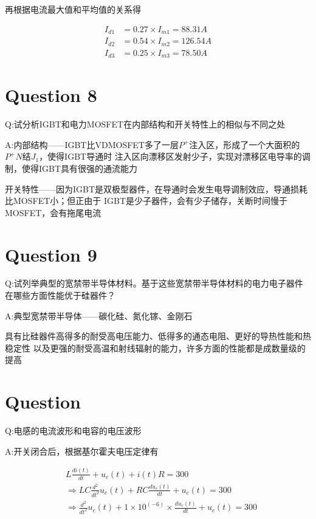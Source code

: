 \documentclass[a4paper]{article}
\begin{document}
再根据电流最大值和平均值的关系得

\begin{equation}
    \begin{aligned}
        I_{d1} & = 0.27\times I_{m1} = 88.31A  \\
        I_{d2} & = 0.54\times I_{m2} = 126.54A \\
        I_{d3} & = 0.25\times I_{m3} = 78.50A
    \end{aligned}
\end{equation}

\section{Question 8}

Q:试分析IGBT和电力MOSFET在内部结构和开关特性上的相似与不同之处

A:内部结构——IGBT比VDMOSFET多了一层$P^{+}$注入区，形成了一个大面积的$P^{+}N$结$J_1$，使得IGBT导通时
注入区向漂移区发射少子，实现对漂移区电导率的调制，使得IGBT具有很强的通流能力

开关特性——因为IGBT是双极型器件，在导通时会发生电导调制效应，导通损耗比MOSFET小；但正由于
IGBT是少子器件，会有少子储存，关断时间慢于MOSFET，会有拖尾电流

\section{Question 9}

Q:试列举典型的宽禁带半导体材料。基于这些宽禁带半导体材料的电力电子器件在哪些方面性能优于硅器件？

A:典型宽禁带半导体——碳化硅、氮化镓、金刚石

具有比硅器件高得多的耐受高电压能力、低得多的通态电阻、更好的导热性能和热稳定性
以及更强的耐受高温和射线辐射的能力，许多方面的性能都是成数量级的提高

\section{Question}

Q:电感的电流波形和电容的电压波形

A:开关闭合后，根据基尔霍夫电压定律有

\begin{equation}
    \begin{aligned}
         & L\frac{di(t)}{dt}+u_c(t)+i(t)R=300                                                        \\
         & \Rightarrow LC\frac{d^2}{dt^2}u_c(t)+RC\frac{du_c(t)}{dt}+u_c(t) = 300                    \\
         & \Rightarrow \frac{d^2}{dt^2}u_c(t)+1\times 10^{(-6)}\times \frac{du_c(t)}{dt} +u_c(t) = 300
    \end{aligned}
\end{equation}
\end{document}
